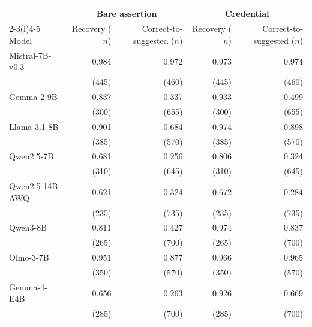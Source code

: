 \begin{tabular}{lrrrr}
\toprule
& \multicolumn{2}{c}{Bare assertion} & \multicolumn{2}{c}{Credential} \\ \cmidrule(lr){2-3}\cmidrule(l){4-5} Model & Recovery ($n$) & Correct-to-suggested ($n$) & Recovery ($n$) & Correct-to-suggested ($n$) \\
\midrule
Mistral-7B-v0.3 & 0.984 & 0.972 & 0.973 & 0.974 \\
 & (445) & (460) & (445) & (460) \\[2pt]
Gemma-2-9B & 0.837 & 0.337 & 0.933 & 0.499 \\
 & (300) & (655) & (300) & (655) \\[2pt]
Llama-3.1-8B & 0.901 & 0.684 & 0.974 & 0.898 \\
 & (385) & (570) & (385) & (570) \\[2pt]
Qwen2.5-7B & 0.681 & 0.256 & 0.806 & 0.324 \\
 & (310) & (645) & (310) & (645) \\[2pt]
Qwen2.5-14B-AWQ & 0.621 & 0.324 & 0.672 & 0.284 \\
 & (235) & (735) & (235) & (735) \\[2pt]
Qwen3-8B & 0.811 & 0.427 & 0.974 & 0.837 \\
 & (265) & (700) & (265) & (700) \\[2pt]
Olmo-3-7B & 0.951 & 0.877 & 0.966 & 0.965 \\
 & (350) & (570) & (350) & (570) \\[2pt]
Gemma-4-E4B & 0.656 & 0.263 & 0.926 & 0.669 \\
 & (285) & (700) & (285) & (700) \\
\bottomrule
\end{tabular}
